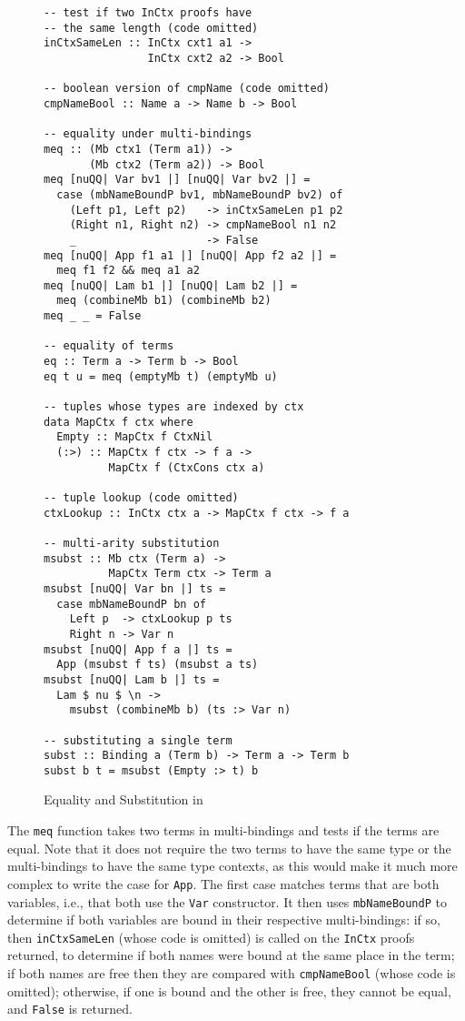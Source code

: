 \documentclass[natbib]{sigplanconf}
\begin{document}
\begin{figure}[t]
\vspace{-5pt}
\begin{lstlisting}
-- test if two InCtx proofs have
-- the same length (code omitted)
inCtxSameLen :: InCtx cxt1 a1 ->
                InCtx cxt2 a2 -> Bool

-- boolean version of cmpName (code omitted)
cmpNameBool :: Name a -> Name b -> Bool

-- equality under multi-bindings
meq :: (Mb ctx1 (Term a1)) ->
       (Mb ctx2 (Term a2)) -> Bool
meq [nuQQ| Var bv1 |] [nuQQ| Var bv2 |] =
  case (mbNameBoundP bv1, mbNameBoundP bv2) of 
    (Left p1, Left p2)   -> inCtxSameLen p1 p2
    (Right n1, Right n2) -> cmpNameBool n1 n2
    _                    -> False
meq [nuQQ| App f1 a1 |] [nuQQ| App f2 a2 |] =
  meq f1 f2 && meq a1 a2
meq [nuQQ| Lam b1 |] [nuQQ| Lam b2 |] =
  meq (combineMb b1) (combineMb b2)
meq _ _ = False

-- equality of terms
eq :: Term a -> Term b -> Bool
eq t u = meq (emptyMb t) (emptyMb u)

-- tuples whose types are indexed by ctx
data MapCtx f ctx where
  Empty :: MapCtx f CtxNil
  (:>) :: MapCtx f ctx -> f a ->
          MapCtx f (CtxCons ctx a)

-- tuple lookup (code omitted)
ctxLookup :: InCtx ctx a -> MapCtx f ctx -> f a

-- multi-arity substitution
msubst :: Mb ctx (Term a) ->
          MapCtx Term ctx -> Term a
msubst [nuQQ| Var bn |] ts =
  case mbNameBoundP bn of
    Left p  -> ctxLookup p ts
    Right n -> Var n
msubst [nuQQ| App f a |] ts =
  App (msubst f ts) (msubst a ts)
msubst [nuQQ| Lam b |] ts =
  Lam $ nu $ \n ->
    msubst (combineMb b) (ts :> Var n)

-- substituting a single term
subst :: Binding a (Term b) -> Term a -> Term b
subst b t = msubst (Empty :> t) b
\end{lstlisting}
\caption{Equality and Substitution in \ourlib}
\label{fig:small-examples}
\end{figure}


The \lstinline{meq} function takes two terms in multi-bindings and
tests if the terms are equal. Note that it does not require the two
terms to have the same type or the multi-bindings to have the same
type contexts, as this would make it much more complex to write the
case for \lstinline{App}. The first case matches terms that are both
variables, i.e., that both use the \lstinline{Var} constructor. It
then uses \lstinline{mbNameBoundP} to determine if both variables are
bound in their respective multi-bindings: if so, then
\lstinline{inCtxSameLen} (whose code is omitted) is called on the
\lstinline{InCtx} proofs returned, to determine if both names were
bound at the same place in the term; if both names are free then they
are compared with \lstinline{cmpNameBool} (whose code is omitted);
otherwise, if one is bound and the other is free, they cannot be
equal, and \lstinline{False} is returned.
\end{document}
